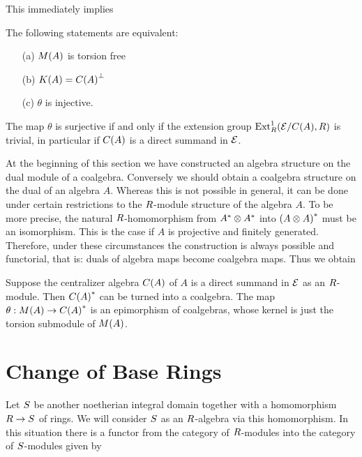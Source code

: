 \documentclass[twoside,12pt]{article}
\begin{document}
This immediately implies

\begin{cor} \label{schwaches Kriterium}
The following statements are equivalent:
\begin{itemize}
\item[(a)] $M(A)$ is torsion free
\item[(b)] $K(A)={C(A)}^{\bot}$
\item[(c)] $\theta$ is injective.
\end{itemize}
\end{cor}


\begin{rem} \label{Ext}
The map $\theta$ is
surjective if and only if the  extension group
${\rm Ext}_{R}^1({\cal E}/C(A), R)$ is trivial, in particular if
$C(A)$ is a direct summand in ${\cal E}$.
\end{rem}

At the beginning of this section we have constructed an algebra
structure on the dual module of a coalgebra. Conversely we should obtain
a coalgebra structure on the dual of an algebra $A$. Whereas this is not
possible in general, it can be done under certain restrictions to
the $R$-module structure of the algebra $A$. To be more precise,
the natural $R$-homomorphism from ${A}^*\otimes {A}^*$ into
${(A\otimes A)}^*$ must be an isomorphism. This is the case
if $A$ is projective and finitely generated. Therefore, under these
circumstances the construction is always possible and functorial,
that is: duals of algebra maps become coalgebra maps. Thus we obtain


\begin{thm} \label{duale Koalgebra}
Suppose the centralizer algebra $C(A)$  of $A$ is a direct summand in
${\cal E}$ as an $R$-module. Then
${C(A)}^*$ can be turned into a coalgebra. The map 
$\theta:M(A)\rightarrow {C(A)}^*$  is an epimorphism of coalgebras, whose
kernel is just the torsion submodule of $M(A)$.
\end{thm}












\section{Change of Base Rings}

Let $S$ be another noetherian integral domain together with a
homomorphism $R \rightarrow S$ of rings. We will consider $S$
as an $R$-algebra via this homomorphism. In this situation there
is a functor from the category of $R$-modules into the category of 
$S$-modules given by
\end{document}
